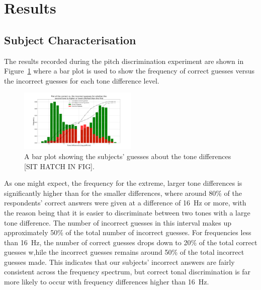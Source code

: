 \documentclass[format=sigconf, review=true, screen=true, anonymous=true]{acmart}
\begin{document}
\section{Results}
\label{sec:results}

\subsection{Subject Characterisation}

The results recorded during the pitch discrimination experiment are shown in Figure~\ref{fig:tone-guesses} where a bar plot is used to show the frequency of correct guesses versus the incorrect guesses for each tone difference level. 

\begin{figure}
  \centering
  \includegraphics[width=0.5\textwidth]{figures/tone_guesses.png}
  \caption{A bar plot showing the subjects' guesses about the tone differences [SIT HATCH IN FIG].}
  \label{fig:tone-guesses}
\end{figure}

As one might expect, the frequency for the extreme, larger tone differences is significantly higher than for the smaller differences, where around 80\% of the respondents' correct answers were given at a difference of \SI{16}{\hertz} or more, with the reason being that it is easier to discriminate between two tones with a large tone difference. The number of incorrect guesses in this interval makes up approximately 50\% of the total number of incorrect guesses. For frequencies less than \SI{16}{\hertz}, the number of correct guesses drops down to 20\% of the total correct guesses w,hile the incorrect guesses remains around 50\% of the total incorrect guesses made. This indicates that our subjects' incorrect answers are fairly consistent across the frequency spectrum, but correct tonal discrimination is far more likely to occur with frequency differences higher than \SI{16}{\hertz}.  

\end{document}
